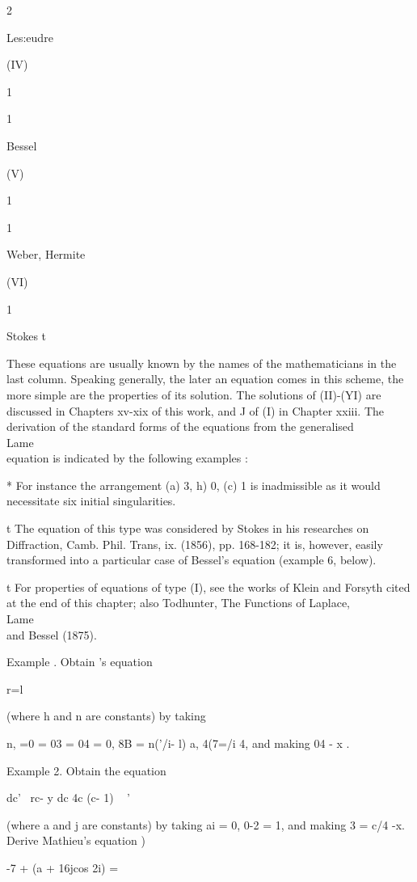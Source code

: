 2

Les:eudre

(IV)

1

1

Bessel

(V)

1

1

Weber, Hermite

(VI)

1

Stokes t

These equations are usually known by the names of the mathematicians
in the last column. Speaking generally, the later an equation comes in
this scheme, the more simple are the properties of its solution. The
solutions of (II)-(YI) are discussed in Chapters xv-xix of this work,
and J of (I) in Chapter xxiii. The derivation of the standard forms of
the equations from the generalised \\Lame\\ equation is indicated by the
following examples :

* For instance the arrangement (a) 3, h) 0, (c) 1 is inadmissible as
it would necessitate six initial singularities.

t The equation of this type was considered by Stokes in his researches
on Diffraction, Camb. Phil. Trans, ix. (1856), pp. 168-182; it is,
however, easily transformed into a particular case of Bessel's
equation (example 6, below).

t For properties of equations of type (I), see the works of Klein and
Forsyth cited at the end of this chapter; also Todhunter, The
Functions of Laplace, \\Lame\\ and Bessel (1875).

%
%

Example . Obtain \Lame's equation

r=l

(where h and n are constants) by taking

n, =0 = 03 = 04 = 0, 8B = n('/i- l) a, 4(7=/i 4, and making 04 - x .

Example 2. Obtain the equation

dc' \ rc- y dc 4c (c- 1) ~ '

(where a and j are constants) by taking ai = 0, 0-2 = 1, and making 3
= c/4 -x. Derive Mathieu's equation )

-7 + (a + 16jcos 2i) =

